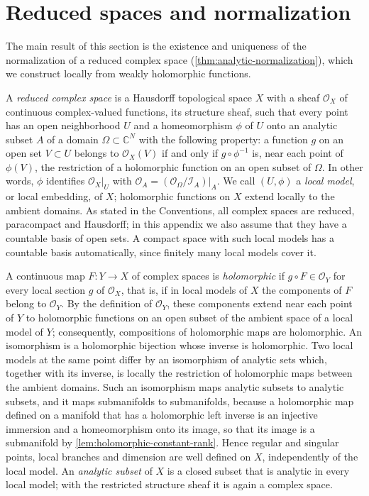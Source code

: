 
\section{Reduced spaces and normalization}
\label{sec:reduced-spaces-normalization}

The main result of this section is the existence and uniqueness of the normalization of a reduced complex space (\cref{thm:analytic-normalization}), which we construct locally from weakly holomorphic functions.

A \emph{reduced complex space} is a Hausdorff topological space $X$ with a sheaf $\mathcal O_X$ of continuous complex-valued functions, its structure sheaf, such that every point has an open neighborhood $U$ and a homeomorphism $\phi$ of $U$ onto an analytic subset $A$ of a domain $\Omega\subset\mathbb C^N$ with the following property: a function $g$ on an open set $V\subset U$ belongs to $\mathcal O_X(V)$ if and only if $g\circ\phi^{-1}$ is, near each point of $\phi(V)$, the restriction of a holomorphic function on an open subset of $\Omega$. In other words, $\phi$ identifies $\mathcal O_X|_U$ with $\mathcal O_A=(\mathcal O_\Omega/\mathcal I_A)|_A$. We call $(U,\phi)$ a \emph{local model}, or local embedding, of $X$; holomorphic functions on $X$ extend locally to the ambient domains. As stated in the Conventions, all complex spaces are reduced, paracompact and Hausdorff; in this appendix we also assume that they have a countable basis of open sets. A compact space with such local models has a countable basis automatically, since finitely many local models cover it.

A continuous map $F\colon Y\to X$ of complex spaces is \emph{holomorphic} if $g\circ F\in\mathcal O_Y$ for every local section $g$ of $\mathcal O_X$, that is, if in local models of $X$ the components of $F$ belong to $\mathcal O_Y$. By the definition of $\mathcal O_Y$, these components extend near each point of $Y$ to holomorphic functions on an open subset of the ambient space of a local model of $Y$; consequently, compositions of holomorphic maps are holomorphic. An isomorphism is a holomorphic bijection whose inverse is holomorphic. Two local models at the same point differ by an isomorphism of analytic sets which, together with its inverse, is locally the restriction of holomorphic maps between the ambient domains. Such an isomorphism maps analytic subsets to analytic subsets, and it maps submanifolds to submanifolds, because a holomorphic map defined on a manifold that has a holomorphic left inverse is an injective immersion and a homeomorphism onto its image, so that its image is a submanifold by \cref{lem:holomorphic-constant-rank}. Hence regular and singular points, local branches and dimension are well defined on $X$, independently of the local model. An \emph{analytic subset} of $X$ is a closed subset that is analytic in every local model; with the restricted structure sheaf it is again a complex space.

